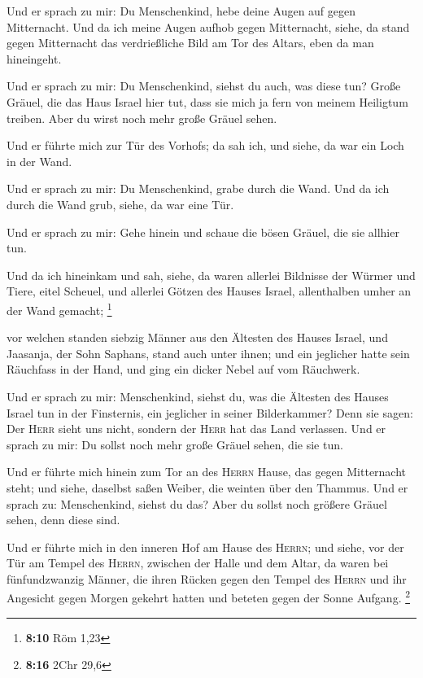  Und er sprach zu mir: Du Menschenkind, hebe deine Augen
auf gegen Mitternacht. Und da ich meine Augen aufhob gegen Mitternacht,
siehe, da stand gegen Mitternacht das verdrießliche Bild am Tor des
Altars, eben da man hineingeht.

 Und er sprach zu mir: Du Menschenkind, siehst du auch,
was diese tun? Große Gräuel, die das Haus Israel hier tut, dass sie mich
ja fern von meinem Heiligtum treiben. Aber du wirst noch mehr große
Gräuel sehen.

 Und er führte mich zur Tür des Vorhofs; da sah ich, und
siehe, da war ein Loch in der Wand.

 Und er sprach zu mir: Du Menschenkind, grabe durch die
Wand. Und da ich durch die Wand grub, siehe, da war eine Tür.

 Und er sprach zu mir: Gehe hinein und schaue die bösen
Gräuel, die sie allhier tun.

 Und da ich hineinkam und sah, siehe, da waren allerlei
Bildnisse der Würmer und Tiere, eitel Scheuel, und allerlei Götzen des
Hauses Israel, allenthalben umher an der Wand gemacht; \footnote{\textbf{8:10}
  Röm 1,23}

 vor welchen standen siebzig Männer aus den Ältesten des
Hauses Israel, und Jaasanja, der Sohn Saphans, stand auch unter ihnen;
und ein jeglicher hatte sein Räuchfass in der Hand, und ging ein dicker
Nebel auf vom Räuchwerk.

 Und er sprach zu mir: Menschenkind, siehst du, was die
Ältesten des Hauses Israel tun in der Finsternis, ein jeglicher in
seiner Bilderkammer? Denn sie sagen: Der \textsc{Herr} sieht uns nicht,
sondern der \textsc{Herr} hat das Land verlassen.  Und er
sprach zu mir: Du sollst noch mehr große Gräuel sehen, die sie tun.

 Und er führte mich hinein zum Tor an des \textsc{Herrn}
Hause, das gegen Mitternacht steht; und siehe, daselbst saßen Weiber,
die weinten über den Thammus.  Und er sprach zu:
Menschenkind, siehst du das? Aber du sollst noch größere Gräuel sehen,
denn diese sind.

 Und er führte mich in den inneren Hof am Hause des
\textsc{Herrn}; und siehe, vor der Tür am Tempel des \textsc{Herrn},
zwischen der Halle und dem Altar, da waren bei fünfundzwanzig Männer,
die ihren Rücken gegen den Tempel des \textsc{Herrn} und ihr Angesicht
gegen Morgen gekehrt hatten und beteten gegen der Sonne Aufgang.
\footnote{\textbf{8:16} 2Chr 29,6}

